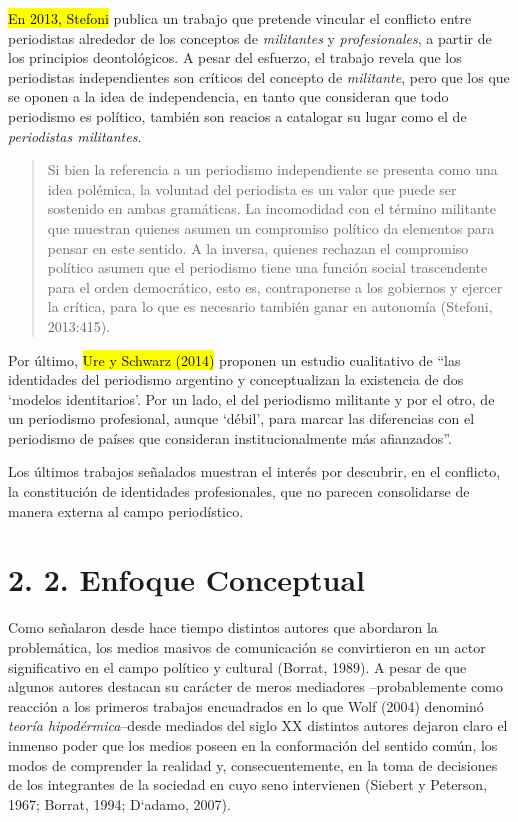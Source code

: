 {\hl{En 2013, Stefoni} publica un trabajo que pretende vincular el conflicto entre periodistas alrededor de los conceptos de \emph{militantes} y \emph{profesionales}, a partir de los principios deontológicos. A pesar del esfuerzo, el trabajo revela que los periodistas independientes son críticos del concepto de \emph{militante}, pero que los que se oponen a la idea de independencia, en tanto que consideran que todo periodismo es político, también son reacios a catalogar su lugar como el de \emph{periodistas militantes}.

\begin{quote}
Si bien la referencia a un periodismo independiente se presenta como una idea polémica, la voluntad del periodista es un valor que puede ser sostenido en ambas gramáticas. La incomodidad con el término militante que muestran quienes asumen un compromiso político da elementos para pensar en este sentido. A la inversa, quienes rechazan el compromiso político asumen que el periodismo tiene una función social trascendente para el orden democrático, esto es, contraponerse a los gobiernos y ejercer la crítica, para lo que es necesario también ganar en autonomía (Stefoni, 2013:415).
\end{quote}

Por último, \hl{Ure y Schwarz (2014)} proponen un estudio cualitativo de \enquote{las identidades del periodismo argentino y conceptualizan la existencia de dos \enquote{modelos identitarios}. Por un lado, el del periodismo militante y por el otro, de un periodismo profesional, aunque \enquote{débil}, para marcar las diferencias con el periodismo de países que consideran institucionalmente más afianzados}.

Los últimos trabajos señalados muestran el interés por descubrir, en el conflicto, la constitución de identidades profesionales, que no parecen consolidarse de manera externa al campo periodístico.

\section{2. 2. Enfoque Conceptual}

Como señalaron desde hace tiempo distintos autores que abordaron la problemática, los medios masivos de comunicación se convirtieron en un actor significativo en el campo político y cultural (Borrat, 1989). A pesar de que algunos autores destacan su carácter de meros mediadores --probablemente como reacción a los primeros trabajos encuadrados en lo que Wolf (2004) denominó \emph{teoría hipodérmica}--desde mediados del siglo XX distintos autores dejaron claro el inmenso poder que los medios poseen en la conformación del sentido común, los modos de comprender la realidad y, consecuentemente, en la toma de decisiones de los integrantes de la sociedad en cuyo seno intervienen (Siebert y Peterson, 1967; Borrat, 1994; D`adamo, 2007).

}
